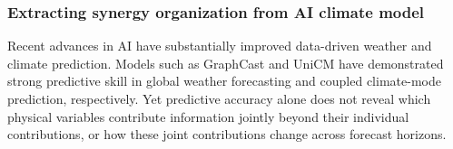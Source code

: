 \documentclass[fleqn,10pt]{wlscirep}
\newcommand{\rev}[1]{\textcolor{red}{#1}}
\theoremstyle{naturetheorem}
\begin{document}
\subsubsection*{Extracting synergy organization from AI climate model}
Recent advances in AI have substantially improved data-driven weather and climate prediction. Models such as GraphCast \cite{Lam2023GraphCast} and UniCM \cite{yuan2026learning} have demonstrated strong predictive skill in global weather forecasting and coupled climate-mode prediction, respectively. Yet predictive accuracy alone does not reveal which physical variables contribute information jointly beyond their individual contributions, or how these joint contributions change across forecast horizons.
\end{document}

